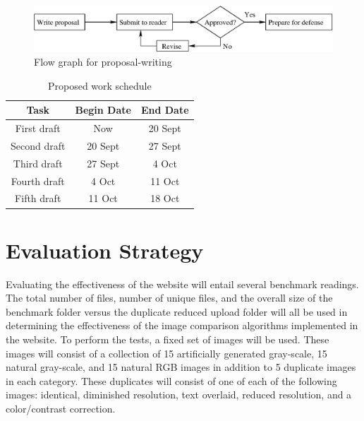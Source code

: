 \documentclass[11pt]{article}
\begin{document}
\begin{figure}[htbp]
\centering
\includegraphics[width=5in]{flow}
\caption{Flow graph for proposal-writing}
\label{intro-fig1}
\end{figure}

\begin{table}[htbp]
\centering
\begin{tabular}{|c||c|c|}
\hline
\bf Task & \bf Begin Date & \bf End Date\\\hline\hline
First draft & Now & 20 Sept\\\hline
Second draft & 20 Sept & 27 Sept\\\hline
Third draft & 27 Sept & 4 Oct\\\hline
Fourth draft & 4 Oct & 11 Oct\\\hline
Fifth draft & 11 Oct & 18 Oct\\\hline
\end{tabular}
\caption{Proposed work schedule}
\label{intro-tab1}
\end{table}

\vspace*{-.2in}
\section{Evaluation Strategy}
\label{sec:evaluate}
\vspace*{-.1in}


Evaluating the effectiveness of the website will entail several benchmark readings. The total number of files, number of unique files, and the overall size of the benchmark folder versus the duplicate reduced upload folder will all be used in determining the effectiveness of the image comparison algorithms implemented in the website. To perform the tests, a fixed set of images will be used. These images will consist of a collection of 15 artificially generated gray-scale, 15 natural gray-scale, and 15 natural RGB images in addition to 5 duplicate images in each category. These duplicates will consist of one of each of the following images: identical, diminished resolution, text overlaid, reduced resolution, and a color/contrast correction.
\end{document}
